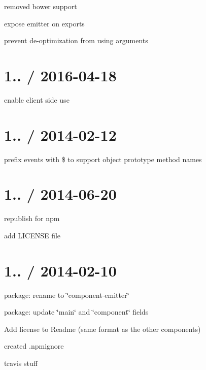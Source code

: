 
\begin{DoxyItemize}
\item removed bower support
\item expose emitter on {\ttfamily exports}
\item prevent de-\/optimization from using {\ttfamily arguments}
\end{DoxyItemize}

\section*{1.. / 2016-\/04-\/18 }


\begin{DoxyItemize}
\item enable client side use
\end{DoxyItemize}

\section*{1.. / 2014-\/02-\/12 }


\begin{DoxyItemize}
\item prefix events with {\ttfamily \$} to support object prototype method names
\end{DoxyItemize}

\section*{1.. / 2014-\/06-\/20 }


\begin{DoxyItemize}
\item republish for npm
\item add L\+I\+C\+E\+N\+SE file
\end{DoxyItemize}

\section*{1.. / 2014-\/02-\/10 }


\begin{DoxyItemize}
\item package\+: rename to \char`\"{}component-\/emitter\char`\"{}
\item package\+: update \char`\"{}main\char`\"{} and \char`\"{}component\char`\"{} fields
\item Add license to Readme (same format as the other components)
\item created .npmignore
\item travis stuff
\end{DoxyItemize}

